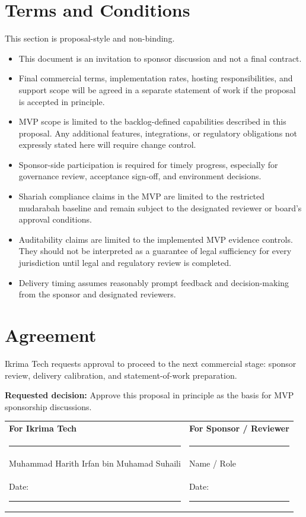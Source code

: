 \documentclass[11pt,a4paper]{article}
\begin{document}
\section{Terms and Conditions}

This section is proposal-style and non-binding.

\begin{itemize}
    \item This document is an invitation to sponsor discussion and not a final contract.
    \item Final commercial terms, implementation rates, hosting responsibilities, and support scope will be agreed in a separate statement of work if the proposal is accepted in principle.
    \item MVP scope is limited to the backlog-defined capabilities described in this proposal. Any additional features, integrations, or regulatory obligations not expressly stated here will require change control.
    \item Sponsor-side participation is required for timely progress, especially for governance review, acceptance sign-off, and environment decisions.
    \item Shariah compliance claims in the MVP are limited to the restricted mudarabah baseline and remain subject to the designated reviewer or board's approval conditions.
    \item Auditability claims are limited to the implemented MVP evidence controls. They should not be interpreted as a guarantee of legal sufficiency for every jurisdiction until legal and regulatory review is completed.
    \item Delivery timing assumes reasonably prompt feedback and decision-making from the sponsor and designated reviewers.
\end{itemize}

\section{Agreement}

Ikrima Tech requests approval to proceed to the next commercial stage: sponsor review, delivery calibration, and statement-of-work preparation.

\textbf{Requested decision:} Approve this proposal in principle as the basis for MVP sponsorship discussions.

\vspace{1.2cm}
\begin{tabularx}{\textwidth}{X X}
\textbf{For Ikrima Tech} & \textbf{For Sponsor / Reviewer} \\
\rule{6cm}{0.4pt} & \rule{6cm}{0.4pt} \\
Muhammad Harith Irfan bin Muhamad Suhaili & Name / Role \\
Date: \rule{3cm}{0.4pt} & Date: \rule{3cm}{0.4pt} \\
\end{tabularx}
\end{document}
